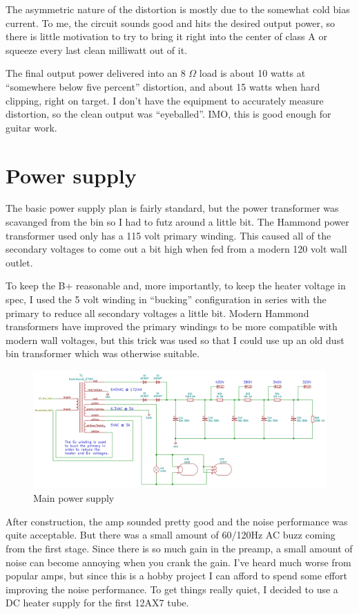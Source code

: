 \documentclass[pdftex,letterpaper,11pt]{article}
\begin{document}
The asymmetric nature of the distortion is mostly due to the somewhat cold bias current. To me, the circuit sounds good and hits the desired output power, so there is little motivation to try to bring it right into the center of class A or squeeze every last clean milliwatt out of it.

The final output power delivered into an 8 $\Omega$ load is about 10 watts at ``somewhere below five percent'' distortion, and about 15 watts when hard clipping, right on target. I don't have the equipment to accurately measure distortion, so the clean output was ``eyeballed''. IMO, this is good enough for guitar work.

\section{Power supply}

The basic power supply plan is fairly standard, but the power transformer was scavanged from the bin so I had to futz around a little bit. The Hammond power transformer used only has a 115 volt primary winding. This caused all of the secondary voltages to come out a bit high when fed from a modern 120 volt wall outlet. 

To keep the B+ reasonable and, more importantly, to keep the heater voltage in spec, I used the 5 volt winding in ``bucking'' configuration  in series with the primary to reduce all secondary voltages a little bit. Modern Hammond transformers have improved the primary windings to be more compatible with modern wall voltages, but this trick was used so that I could use up an old dust bin transformer which was otherwise suitable.

\begin{figure}[H]
\centering
\caption{Main power supply}
\includegraphics[width=\textwidth]{power_supply_1.png}
\end{figure}

After construction, the amp sounded pretty good and the noise performance was quite acceptable. But there was a small amount of 60/120Hz AC buzz coming from the first stage. Since there is so much gain in the preamp, a small amount of noise can become annoying when you crank the gain. I've heard much worse from popular amps, but since this is a hobby project I can afford to spend some effort improving the noise performance. To get things really quiet, I decided to use a DC heater supply for the first 12AX7 tube.
\end{document}
